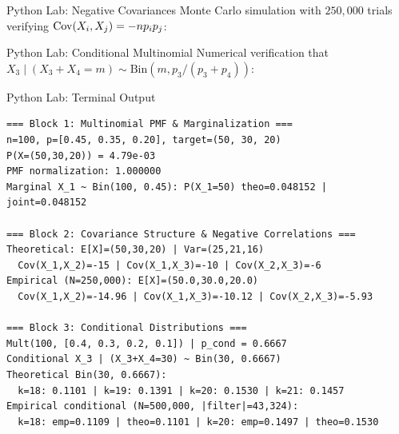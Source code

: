 \documentclass[aspectratio=169,xcolor={dvipsnames,table}]{beamer}
\begin{document}
\begin{frame}[fragile]{Python Lab: Negative Covariances}
	\vspace{-0.05cm}
	\scriptsize
	Monte Carlo simulation with $250{,}000$ trials verifying $\operatorname{Cov}(X_{i}, X_{j}) = -n p_{i} p_{j}$:
	\vspace{0.02cm}
	{
	}
\end{frame}

\begin{frame}[fragile]{Python Lab: Conditional Multinomial}
	\vspace{-0.05cm}
	\scriptsize
	Numerical verification that $X_{3} \mid (X_{3} + X_{4} = m) \sim \text{Bin}(m, p_{3}/(p_{3} + p_{4}))$:
	\vspace{0.02cm}
	{
	}
\end{frame}

\begin{frame}[fragile]{Python Lab: Terminal Output}
	\vspace{-0.1cm}
	\begin{block}{}
		\fontsize{4pt}{5pt}\selectfont
		\begin{verbatim}
=== Block 1: Multinomial PMF & Marginalization ===
n=100, p=[0.45, 0.35, 0.20], target=(50, 30, 20)
P(X=(50,30,20)) = 4.79e-03
PMF normalization: 1.000000
Marginal X_1 ~ Bin(100, 0.45): P(X_1=50) theo=0.048152 | joint=0.048152

=== Block 2: Covariance Structure & Negative Correlations ===
Theoretical: E[X]=(50,30,20) | Var=(25,21,16)
  Cov(X_1,X_2)=-15 | Cov(X_1,X_3)=-10 | Cov(X_2,X_3)=-6
Empirical (N=250,000): E[X]=(50.0,30.0,20.0)
  Cov(X_1,X_2)=-14.96 | Cov(X_1,X_3)=-10.12 | Cov(X_2,X_3)=-5.93

=== Block 3: Conditional Distributions ===
Mult(100, [0.4, 0.3, 0.2, 0.1]) | p_cond = 0.6667
Conditional X_3 | (X_3+X_4=30) ~ Bin(30, 0.6667)
Theoretical Bin(30, 0.6667):
  k=18: 0.1101 | k=19: 0.1391 | k=20: 0.1530 | k=21: 0.1457
Empirical conditional (N=500,000, |filter|=43,324):
  k=18: emp=0.1109 | theo=0.1101 | k=20: emp=0.1497 | theo=0.1530
		\end{verbatim}
	\end{block}
\end{frame}
\end{document}
